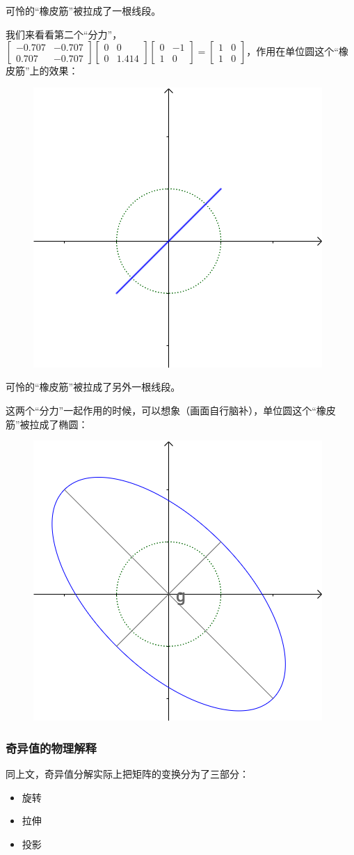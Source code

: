 \documentclass[12pt]{article}
\begin{document}
可怜的“橡皮筋”被拉成了一根线段。

我们来看看第二个“分力”，$\begin{bmatrix}-0.707&-0.707\\0.707&-0.707\end{bmatrix}\begin{bmatrix}0&0\\0&1.414\end{bmatrix}\begin{bmatrix}0&-1\\1&0\end{bmatrix}=\begin{bmatrix}1&0\\1&0\end{bmatrix}$，作用在单位圆这个“橡皮筋”上的效果：
\begin{figure}[H]
    \centering
    \includegraphics[width=.3\textwidth]{fig/UnderstandSingularValue_4.png}
\end{figure} 

可怜的“橡皮筋”被拉成了另外一根线段。

这两个“分力”一起作用的时候，可以想象（画面自行脑补），单位圆这个“橡皮筋”被拉成了椭圆：
\begin{figure}[H]
    \centering
    \includegraphics[width=.3\textwidth]{fig/UnderstandSingularValue_5.png}
\end{figure} 

\subsubsection{奇异值的物理解释}
同上文，奇异值分解实际上把矩阵的变换分为了三部分：
\begin{itemize}
\setlength{\itemsep}{0pt}
\setlength{\parsep}{0pt}
\setlength{\parskip}{0pt}
    \item 旋转
    \item 拉伸
    \item 投影
\end{itemize}
\end{document}
